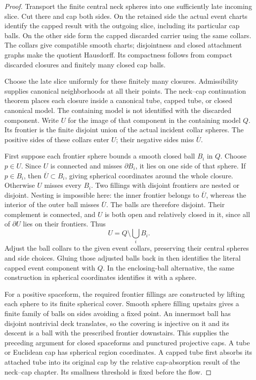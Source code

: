 \begin{proof}
Transport the finite central neck spheres into one sufficiently late
incoming slice.  Cut there and cap both sides.  On the retained side
the actual event charts identify the capped result with the outgoing
slice, including its particular cap balls.  On the other side form
the capped discarded carrier using the same collars.  The collars
give compatible smooth charts; disjointness and closed attachment
graphs make the quotient Hausdorff.  Its compactness follows from
compact discarded closures and finitely many closed cap balls.

Choose the late slice uniformly for these finitely many closures.
Admissibility supplies canonical neighborhoods at all their points.
The neck--cap continuation theorem places each closure inside a
canonical tube, capped tube, or closed canonical model.  The containing
model is not identified with the discarded component.  Write $U$ for
the image of that component in the containing model $Q$.  Its frontier is
the finite disjoint union of the actual incident collar spheres.
The positive sides of these collars enter $U$; their negative sides
miss $\overline U$.

First suppose each frontier sphere bounds a smooth closed ball $B_i$ in
$Q$.  Choose $p\in U$.  Since $U$ is connected and misses $\partial B_i$,
it lies on one side of that sphere.  If $p\in B_i$, then
$\overline U\subset B_i$, giving spherical coordinates around the whole
closure.  Otherwise $U$ misses every $B_i$.  Two fillings with disjoint
frontiers are nested or disjoint.  Nesting is impossible here: the inner
frontier belongs to $\overline U$, whereas the interior of the outer ball
misses $\overline U$.  The balls are therefore disjoint.  Their complement
is connected, and $U$ is both open and relatively closed in it, since all
of $\partial U$ lies on their frontiers.  Thus
\[
                 U=Q\setminus\bigcup_i B_i.
\]
Adjust the ball collars to the given event collars, preserving their
central spheres and side choices.  Gluing those adjusted balls back in
then identifies the literal capped event component with $Q$.  In the
enclosing-ball alternative, the same construction in spherical
coordinates identifies it with a sphere.

For a positive spaceform, the required frontier fillings are constructed
by lifting each sphere to its finite spherical cover.  Smooth sphere
filling upstairs gives a finite family of balls on sides avoiding a fixed
point.  An innermost ball has disjoint nontrivial deck translates, so the
covering is injective on it and its descent is a ball with the prescribed
frontier downstairs.  This supplies the preceding argument for closed
spaceforms and punctured projective caps.  A tube or Euclidean cap has
spherical region coordinates.  A capped tube first absorbs its attached
tube into its original cap by the relative cap-absorption result of the
neck--cap chapter.  Its smallness threshold is fixed before the flow.


\end{proof}
